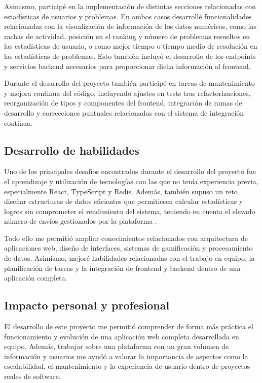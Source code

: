 Asimismo, participé en la implementación de distintas secciones relacionadas con estadísticas de usuarios y problemas. En ambos casos desarrollé funcionalidades relacionadas con la visualización de información de los datos numéricos, como las rachas de actividad, posición en el ranking y número de problemas resueltos en las estadísticas de usuario, o como mejor tiempo o tiempo medio de resolución en las estadísticas de problemas. Esto también incluyó el desarrollo de los endpoints y servicios backend necesarios para proporcionar dicha información al frontend. 

Durante el desarrollo del proyecto también participé en tareas de mantenimiento y mejora continua del código, incluyendo ajustes en tests tras refactorizaciones, reorganización de tipos y componentes del frontend, integración de ramas de desarrollo y correcciones puntuales relacionadas con el sistema de integración continua.

\subsection*{Desarrollo de habilidades}
Uno de los principales desafíos encontrados durante el desarrollo del proyecto fue el aprendizaje y utilización de tecnologías con las que no tenía experiencia previa, especialmente React, TypeScript y Redis. Además, también supuso un reto diseñar estructuras de datos eficientes que permitiesen calcular estadísticas y logros sin comprometer el rendimiento del sistema, teniendo en cuenta el elevado número de envíos gestionados por la plataforma \aer.

Todo ello me permitió ampliar conocimientos relacionados con arquitectura de aplicaciones web, diseño de interfaces, sistemas de gamificación y procesamiento de datos. Asimismo, mejoré habilidades relacionadas con el trabajo en equipo, la planificación de tareas y la integración de frontend y backend dentro de una aplicación completa.

\subsection*{Impacto personal y profesional}
El desarrollo de este proyecto me permitió comprender de forma más práctica el funcionamiento y evolución de una aplicación web completa desarrollada en equipo. Además, trabajar sobre una plataforma con un gran volumen de información y usuarios me ayudó a valorar la importancia de aspectos como la escalabilidad, el mantenimiento y la experiencia de usuario dentro de proyectos reales de software.


